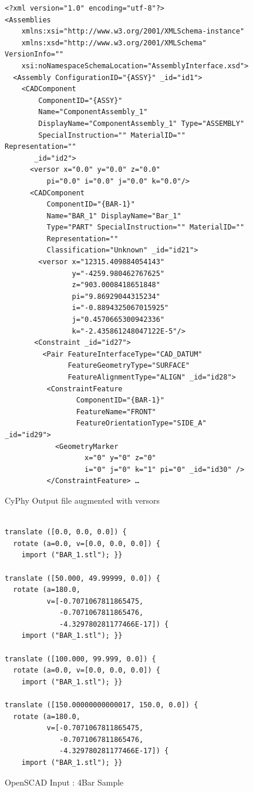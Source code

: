 \documentclass[]{report}
\begin{document}
\begin{figure}
	\begin{lstlisting}
<?xml version="1.0" encoding="utf-8"?>
<Assemblies  
    xmlns:xsi="http://www.w3.org/2001/XMLSchema-instance" 
    xmlns:xsd="http://www.w3.org/2001/XMLSchema" VersionInfo=""     
    xsi:noNamespaceSchemaLocation="AssemblyInterface.xsd">
  <Assembly ConfigurationID="{ASSY}" _id="id1">
    <CADComponent  
        ComponentID="{ASSY}" 
        Name="ComponentAssembly_1"
        DisplayName="ComponentAssembly_1" Type="ASSEMBLY"
        SpecialInstruction="" MaterialID="" Representation=""
       _id="id2">
      <versor x="0.0" y="0.0" z="0.0" 
          pi="0.0" i="0.0" j="0.0" k="0.0"/>
      <CADComponent 
          ComponentID="{BAR-1}" 
          Name="BAR_1" DisplayName="Bar_1"
          Type="PART" SpecialInstruction="" MaterialID=""
          Representation=""
          Classification="Unknown" _id="id21">
        <versor x="12315.409884054143" 
                y="-4259.980462767625"
                z="903.0008418651848" 
                pi="9.86929044315234" 
                i="-0.8894325067015925" 
                j="0.4570665300942336"  
                k="-2.435861248047122E-5"/>
       <Constraint _id="id27">
         <Pair FeatureInterfaceType="CAD_DATUM"
               FeatureGeometryType="SURFACE"           
               FeatureAlignmentType="ALIGN" _id="id28">
          <ConstraintFeature 
                 ComponentID="{BAR-1}" 
                 FeatureName="FRONT"
                 FeatureOrientationType="SIDE_A" _id="id29">
            <GeometryMarker 
                   x="0" y="0" z="0" 
                   i="0" j="0" k="1" pi="0" _id="id30" />
          </ConstraintFeature> …
\end{lstlisting}
\caption{CyPhy Output file augmented with versors}
\end{figure}

\begin{figure}
	\begin{lstlisting}
	
translate ([0.0, 0.0, 0.0]) {
  rotate (a=0.0, v=[0.0, 0.0, 0.0]) {
    import ("BAR_1.stl"); }}

translate ([50.000, 49.99999, 0.0]) {
  rotate (a=180.0, 
          v=[-0.7071067811865475, 
             -0.7071067811865476, 
             -4.329780281177466E-17]) {
    import ("BAR_1.stl"); }}

translate ([100.000, 99.999, 0.0]) {
  rotate (a=0.0, v=[0.0, 0.0, 0.0]) {
    import ("BAR_1.stl"); }}

translate ([150.00000000000017, 150.0, 0.0]) {
  rotate (a=180.0, 
          v=[-0.7071067811865475, 
             -0.7071067811865476,
             -4.329780281177466E-17]) {
    import ("BAR_1.stl"); }}
\end{lstlisting}
\caption{OpenSCAD Input : 4Bar Sample}
\end{figure}
\end{document}
